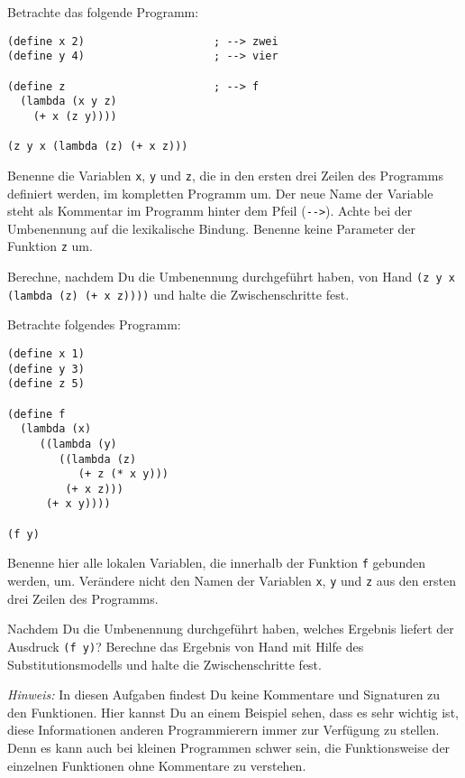 \begin{aufgabe}

  Betrachte das folgende Programm:

\begin{lstlisting}
(define x 2)                    ; --> zwei
(define y 4)                    ; --> vier

(define z                       ; --> f
  (lambda (x y z)
    (+ x (z y))))

(z y x (lambda (z) (+ x z)))
\end{lstlisting}
%
  Benenne die Variablen \lstinline{x}, \lstinline{y} und \lstinline{z}, die in
  den ersten drei Zeilen des Programms definiert werden, im kompletten
  Programm um. Der neue Name der Variable steht als Kommentar im
  Programm hinter dem Pfeil (\lstinline{-->}).  Achte bei der
  Umbenennung auf die lexikalische Bindung.  Benenne keine
  Parameter der Funktion \lstinline{z} um.

  Berechne, nachdem Du die Umbenennung durchgeführt haben, von
  Hand \lstinline{(z y x}
  \lstinline{(lambda (z) (+ x z))))} und halte die Zwischenschritte
  fest.

\end{aufgabe}

\begin{aufgabe}
  Betrachte folgendes Programm:

\begin{lstlisting}
(define x 1)
(define y 3)
(define z 5)

(define f
  (lambda (x)   
     ((lambda (y)
        ((lambda (z)
           (+ z (* x y)))
         (+ x z)))
      (+ x y))))

(f y)
\end{lstlisting}

  Benenne hier alle lokalen Variablen, die innerhalb der Funktion
  \lstinline{f} gebunden werden, um. Verändere nicht den Namen der
  Variablen \lstinline{x}, \lstinline{y} und \lstinline{z} aus den ersten drei Zeilen
  des Programms.

  Nachdem Du die Umbenennung durchgeführt haben, welches Ergebnis liefert
  der Ausdruck \lstinline{(f y)}? Berechne das Ergebnis von Hand mit Hilfe
  des Substitutionsmodells und halte die Zwischenschritte fest.

  \noindent \emph{Hinweis:} In diesen Aufgaben findest Du keine
  Kommentare und Signaturen zu den Funktionen. Hier kannst Du an einem
  Beispiel sehen, dass es sehr wichtig ist, diese Informationen
  anderen Programmierern immer zur Verfügung zu stellen. Denn es kann
  auch bei kleinen Programmen schwer sein, die Funktionsweise der
  einzelnen Funktionen ohne Kommentare zu verstehen.
\end{aufgabe}

